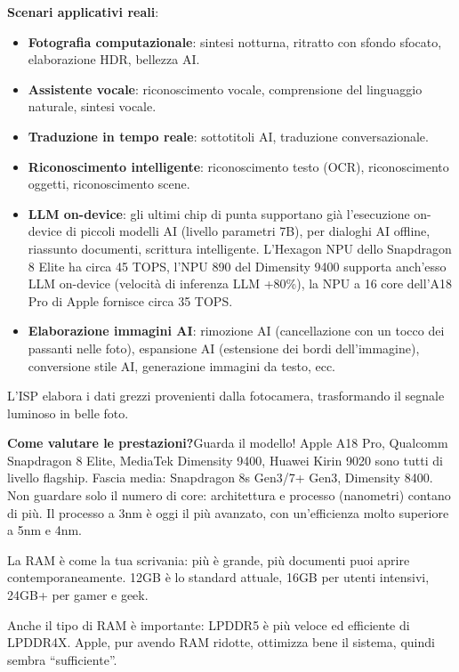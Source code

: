 \textbf{Scenari applicativi reali}:

\begin{itemize}
  \item \textbf{Fotografia computazionale}: sintesi notturna, ritratto con sfondo sfocato, elaborazione HDR, bellezza AI.
  \item \textbf{Assistente vocale}: riconoscimento vocale, comprensione del linguaggio naturale, sintesi vocale.
  \item \textbf{Traduzione in tempo reale}: sottotitoli AI, traduzione conversazionale.
  \item \textbf{Riconoscimento intelligente}: riconoscimento testo (OCR), riconoscimento oggetti, riconoscimento scene.
  \item \textbf{LLM on-device}: gli ultimi chip di punta supportano già l'esecuzione on-device di piccoli modelli AI (livello parametri 7B), per dialoghi AI offline, riassunto documenti, scrittura intelligente. L'Hexagon NPU dello Snapdragon 8 Elite ha circa 45 TOPS, l'NPU 890 del Dimensity 9400 supporta anch'esso LLM on-device (velocità di inferenza LLM +80\%), la NPU a 16 core dell'A18 Pro di Apple fornisce circa 35 TOPS.
  \item \textbf{Elaborazione immagini AI}: rimozione AI (cancellazione con un tocco dei passanti nelle foto), espansione AI (estensione dei bordi dell'immagine), conversione stile AI, generazione immagini da testo, ecc.
\end{itemize}


L'ISP elabora i dati grezzi provenienti dalla fotocamera, trasformando il segnale luminoso in belle foto.

\textbf{Come valutare le prestazioni?}Guarda il modello! Apple A18 Pro, Qualcomm Snapdragon 8 Elite, MediaTek Dimensity 9400, Huawei Kirin 9020 sono tutti di livello flagship. Fascia media: Snapdragon 8s Gen3/7+ Gen3, Dimensity 8400. Non guardare solo il numero di core: architettura e processo (nanometri) contano di più. Il processo a 3nm è oggi il più avanzato, con un'efficienza molto superiore a 5nm e 4nm.


La RAM è come la tua scrivania: più è grande, più documenti puoi aprire contemporaneamente. 12GB è lo standard attuale, 16GB per utenti intensivi, 24GB+ per gamer e geek.

Anche il tipo di RAM è importante: LPDDR5 è più veloce ed efficiente di LPDDR4X. Apple, pur avendo RAM ridotte, ottimizza bene il sistema, quindi sembra “sufficiente”.


